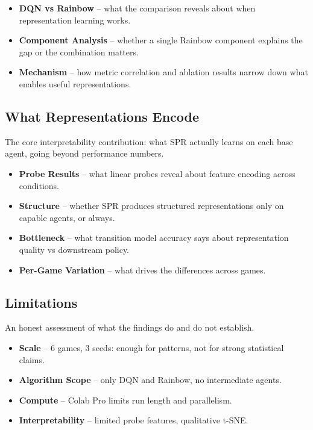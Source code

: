 \documentclass[11pt]{article}
\begin{document}
\begin{itemize}
\item \textbf{DQN vs Rainbow} -- what the comparison reveals about
  when representation learning works.
\item \textbf{Component Analysis} -- whether a single Rainbow
  component explains the gap or the combination matters.
\item \textbf{Mechanism} -- how metric correlation and ablation
  results narrow down what enables useful representations.
\end{itemize}

\subsection{What Representations Encode}

\noindent The core interpretability contribution: what SPR actually
learns on each base agent, going beyond performance numbers.

\begin{itemize}
\item \textbf{Probe Results} -- what linear probes reveal about
  feature encoding across conditions.
\item \textbf{Structure} -- whether SPR produces structured
  representations only on capable agents, or always.
\item \textbf{Bottleneck} -- what transition model accuracy says
  about representation quality vs downstream policy.
\item \textbf{Per-Game Variation} -- what drives the differences
  across games.
\end{itemize}

\subsection{Limitations}

\noindent An honest assessment of what the findings do and do not
establish.

\begin{itemize}
\item \textbf{Scale} -- 6 games, 3 seeds: enough for patterns, not
  for strong statistical claims.
\item \textbf{Algorithm Scope} -- only DQN and Rainbow, no
  intermediate agents.
\item \textbf{Compute} -- Colab Pro limits run length and
  parallelism.
\item \textbf{Interpretability} -- limited probe features,
  qualitative t-SNE.
\end{itemize}
\end{document}
